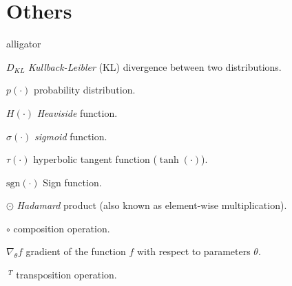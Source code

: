 \section*{Others}
\begin{labeling}{alligator}
	\item [$D_{KL}$]{\textit{Kullback-Leibler} (KL) divergence between two distributions.}
	\item [$p(\cdot)$]{probability distribution.}
	\item [$H(\cdot)$] \textit{Heaviside} function.
	\item [$\sigma(\cdot)$] \textit{sigmoid} function.
	\item [$\tau(\cdot)$] hyperbolic tangent function ($\tanh(\cdot)$).
	\item [$\mathrm{sgn}(\cdot)$] Sign function.
	\item [$\odot$] {\textit{Hadamard} product (also known as element-wise multiplication)}.
	\item [$\circ$] composition operation.
	\item [$\nabla_\theta f$] gradient of the function $f$ with respect to parameters $\theta$.
	\item [$\ ^T$] transposition operation.

\end{labeling}